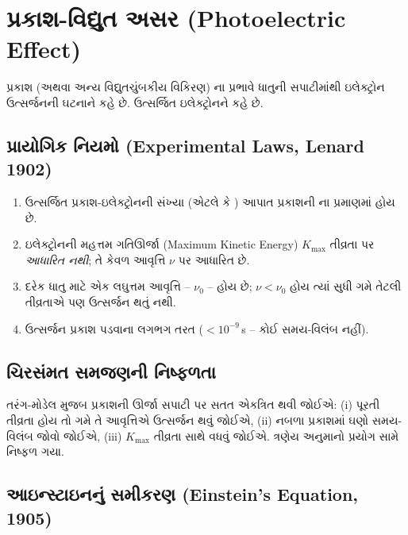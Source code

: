 \section{પ્રકાશ-વિદ્યુત અસર (Photoelectric Effect)}

\begin{vyakhya}
પ્રકાશ (અથવા અન્ય વિદ્યુતચુંબકીય વિકિરણ) ના પ્રભાવે ધાતુની સપાટીમાંથી ઇલેક્ટ્રોન ઉત્સર્જનની ઘટનાને
 કહે છે. ઉત્સર્જિત ઇલેક્ટ્રોનને
 કહે છે.
\end{vyakhya}

\subsection{પ્રાયોગિક નિયમો (Experimental Laws, Lenard 1902)}

\begin{enumerate}
  \item ઉત્સર્જિત પ્રકાશ-ઇલેક્ટ્રોનની સંખ્યા (એટલે કે ) આપાત
       પ્રકાશની  ના પ્રમાણમાં હોય છે.
  \item ઇલેક્ટ્રોનની મહત્તમ ગતિઊર્જા (Maximum Kinetic Energy) $K_{\max}$ તીવ્રતા પર
       \emph{આધારિત નથી}; તે કેવળ આવૃત્તિ $\nu$ પર આધારિત છે.
  \item દરેક ધાતુ માટે એક લઘુત્તમ આવૃત્તિ --  $\nu_0$ --
       હોય છે; $\nu<\nu_0$ હોય ત્યાં સુધી ગમે તેટલી તીવ્રતાએ પણ ઉત્સર્જન થતું નથી.
  \item ઉત્સર્જન પ્રકાશ પડવાના લગભગ તરત ($<10^{-9}\,$s -- કોઈ સમય-વિલંબ નહીં).
\end{enumerate}

\subsection{ચિરસંમત સમજણની નિષ્ફળતા}

તરંગ-મોડેલ મુજબ પ્રકાશની ઊર્જા સપાટી પર સતત એકત્રિત થવી જોઈએ: (i) પૂરતી તીવ્રતા હોય તો ગમે
તે આવૃત્તિએ ઉત્સર્જન થવું જોઈએ, (ii) નબળા પ્રકાશમાં ઘણો સમય-વિલંબ જોવો જોઈએ, (iii) $K_{\max}$
તીવ્રતા સાથે વધવું જોઈએ. ત્રણેય અનુમાનો પ્રયોગ સામે નિષ્ફળ ગયા.

\subsection{આઇન્સ્ટાઇનનું સમીકરણ (Einstein's Equation, 1905)}

